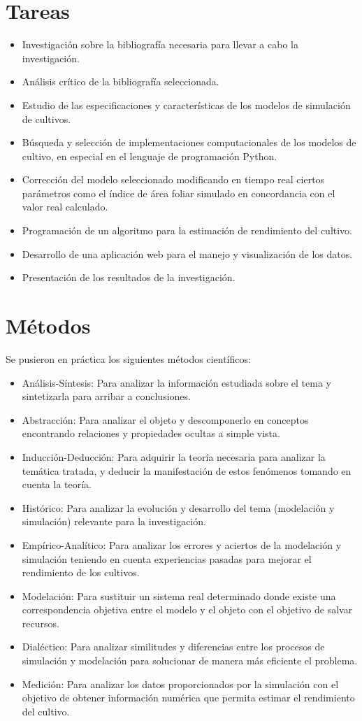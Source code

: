 \section*{Tareas}
\begin{itemize}
	\item Investigación sobre la bibliografía necesaria para llevar a cabo la investigación.
	\item Análisis crítico de la bibliografía seleccionada.
	\item Estudio de las especificaciones y características de los modelos de simulación de cultivos.
	\item Búsqueda y selección de implementaciones computacionales de los modelos de cultivo, en especial en el lenguaje de programación Python.
	\item Corrección del modelo seleccionado modificando en tiempo real ciertos parámetros como el índice de área foliar simulado en concordancia con el valor real calculado. 
	\item Programación de un algoritmo para la estimación de rendimiento del cultivo.
	\item Desarrollo de una aplicación web para el manejo y visualización de los datos.
	\item Presentación de los resultados de la investigación.
\end{itemize}

\section*{Métodos}
Se pusieron en práctica los siguientes métodos científicos:
\begin{itemize}
	\item Análisis-Síntesis: Para analizar la información estudiada sobre el tema y sintetizarla para arribar a conclusiones.
	\item Abstracción: Para analizar el objeto y descomponerlo en conceptos encontrando relaciones y propiedades ocultas a simple vista.
	\item Inducción-Deducción: Para adquirir la teoría necesaria para analizar la temática tratada, y deducir la manifestación de estos fenómenos tomando en cuenta la teoría.
	\item Histórico: Para analizar la evolución y desarrollo del tema (modelación y simulación) relevante para la investigación.
	\item Empírico-Analítico: Para analizar los errores y aciertos de la modelación y simulación teniendo en cuenta experiencias pasadas para mejorar el rendimiento de los cultivos.
	\item Modelación: Para sustituir un sistema real determinado donde existe una correspondencia objetiva entre el modelo y el objeto con el objetivo de salvar recursos.
	\item Dialéctico: Para analizar similitudes y diferencias entre los procesos de simulación y modelación para solucionar de manera más eficiente el problema.
	\item Medición: Para analizar los datos proporcionados por la simulación con el objetivo de obtener información numérica que permita estimar el rendimiento del cultivo.
\end{itemize}

